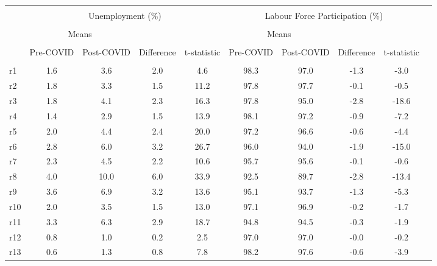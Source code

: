 \begin{tabular*}{\hsize}{ @{\extracolsep{\fill}}l*{9}{c}}
\hline\hline
\\
 & \multicolumn{4}{c}{Unemployment (\%)} & \multicolumn{4}{c}{Labour Force Participation (\%)} \\ 
 \cline{2-5} \cline{6-9} \\
& \multicolumn{2}{c}{Means} & & &\multicolumn{2}{c}{Means} \\
 \cline{2-3} \cline{6-7} \\
 &Pre-COVID &Post-COVID &Difference &t-statistic &Pre-COVID &Post-COVID &Difference &t-statistic \\
\hline
\\
r1                       & 1.6     & 3.6     & 2.0     & 4.6     &98.3     &97.0     &-1.3     &-3.0\\
%
r2                       & 1.8     & 3.3     & 1.5     &11.2     &97.8     &97.7     &-0.1     &-0.5\\
%
r3                       & 1.8     & 4.1     & 2.3     &16.3     &97.8     &95.0     &-2.8     &-18.6\\
%
r4                       & 1.4     & 2.9     & 1.5     &13.9     &98.1     &97.2     &-0.9     &-7.2\\
%
r5                       & 2.0     & 4.4     & 2.4     &20.0     &97.2     &96.6     &-0.6     &-4.4\\
%
r6                       & 2.8     & 6.0     & 3.2     &26.7     &96.0     &94.0     &-1.9     &-15.0\\
%
r7                       & 2.3     & 4.5     & 2.2     &10.6     &95.7     &95.6     &-0.1     &-0.6\\
%
r8                       & 4.0     &10.0     & 6.0     &33.9     &92.5     &89.7     &-2.8     &-13.4\\
%
r9                       & 3.6     & 6.9     & 3.2     &13.6     &95.1     &93.7     &-1.3     &-5.3\\
%
r10                      & 2.0     & 3.5     & 1.5     &13.0     &97.1     &96.9     &-0.2     &-1.7\\
%
r11                      & 3.3     & 6.3     & 2.9     &18.7     &94.8     &94.5     &-0.3     &-1.9\\
%
r12                      & 0.8     & 1.0     & 0.2     & 2.5     &97.0     &97.0     &-0.0     &-0.2\\
%
r13                      & 0.6     & 1.3     & 0.8     & 7.8     &98.2     &97.6     &-0.6     &-3.9\\

\end{tabular*}
